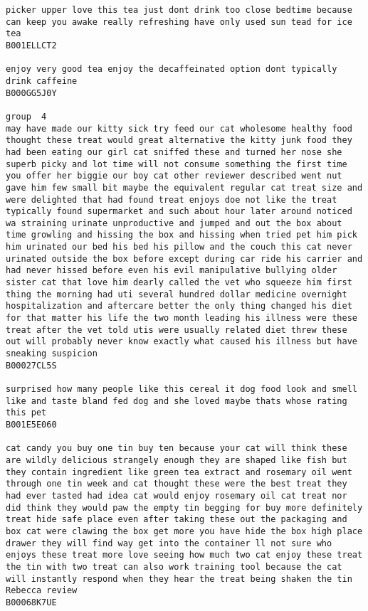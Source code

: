 \documentclass[11pt]{article}
\begin{document}
\begin{Verbatim}[commandchars=\\\{\}]
picker upper love this tea just dont drink too close bedtime because can keep you awake really refreshing have only used sun tead for ice tea
B001ELLCT2

enjoy very good tea enjoy the decaffeinated option dont typically drink caffeine
B000GG5J0Y

group  4
may have made our kitty sick try feed our cat wholesome healthy food thought these treat would great alternative the kitty junk food they had been eating our girl cat sniffed these and turned her nose she superb picky and lot time will not consume something the first time you offer her biggie our boy cat other reviewer described went nut gave him few small bit maybe the equivalent regular cat treat size and were delighted that had found treat enjoys doe not like the treat typically found supermarket and such about hour later around noticed wa straining urinate unproductive and jumped and out the box about time growling and hissing the box and hissing when tried pet him pick him urinated our bed his bed his pillow and the couch this cat never urinated outside the box before except during car ride his carrier and had never hissed before even his evil manipulative bullying older sister cat that love him dearly called the vet who squeeze him first thing the morning had uti several hundred dollar medicine overnight hospitalization and aftercare better the only thing changed his diet for that matter his life the two month leading his illness were these treat after the vet told utis were usually related diet threw these out will probably never know exactly what caused his illness but have sneaking suspicion
B00027CL5S

surprised how many people like this cereal it dog food look and smell like and taste bland fed dog and she loved maybe thats whose rating this pet
B001E5E060

cat candy you buy one tin buy ten because your cat will think these are wildly delicious strangely enough they are shaped like fish but they contain ingredient like green tea extract and rosemary oil went through one tin week and cat thought these were the best treat they had ever tasted had idea cat would enjoy rosemary oil cat treat nor did think they would paw the empty tin begging for buy more definitely treat hide safe place even after taking these out the packaging and box cat were clawing the box get more you have hide the box high place drawer they will find way get into the container ll not sure who enjoys these treat more love seeing how much two cat enjoy these treat the tin with two treat can also work training tool because the cat will instantly respond when they hear the treat being shaken the tin Rebecca review
B00068K7UE


\end{Verbatim}
\end{document}
